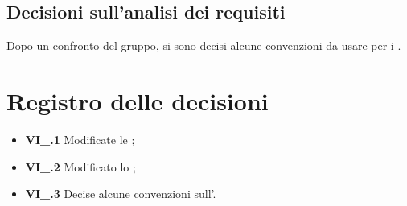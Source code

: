 \subsection{Decisioni sull'analisi dei requisiti}
Dopo un confronto del gruppo, si sono decisi alcune convenzioni da usare per i .

\section{Registro delle decisioni}
\begin{itemize}
  \item \textbf{VI\_\Data.1} Modificate le \textit{\NdP};
  \item \textbf{VI\_\Data.2} Modificato lo \textit{\SdF};
  \item \textbf{VI\_\Data.3} Decise alcune convenzioni sull'\textit{\AdR}.

\end{itemize}




